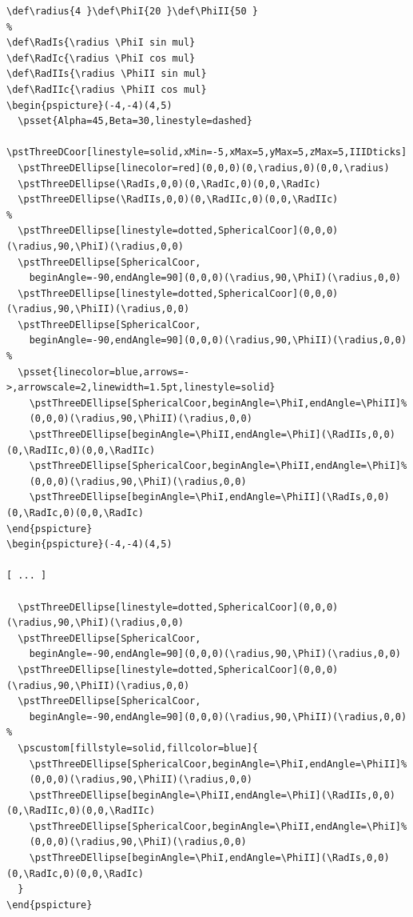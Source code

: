 \documentclass[11pt,english,bibliography=totoc,parskip=false,headings=small,
    headinclude=false,footinclude=false,twoside,english,usegeometry]{pst-doc}
\begin{document}
\begin{lstlisting}
\def\radius{4 }\def\PhiI{20 }\def\PhiII{50 }
%
\def\RadIs{\radius \PhiI sin mul}
\def\RadIc{\radius \PhiI cos mul}
\def\RadIIs{\radius \PhiII sin mul}
\def\RadIIc{\radius \PhiII cos mul}
\begin{pspicture}(-4,-4)(4,5)
  \psset{Alpha=45,Beta=30,linestyle=dashed}
  \pstThreeDCoor[linestyle=solid,xMin=-5,xMax=5,yMax=5,zMax=5,IIIDticks]
  \pstThreeDEllipse[linecolor=red](0,0,0)(0,\radius,0)(0,0,\radius)
  \pstThreeDEllipse(\RadIs,0,0)(0,\RadIc,0)(0,0,\RadIc)
  \pstThreeDEllipse(\RadIIs,0,0)(0,\RadIIc,0)(0,0,\RadIIc)
%
  \pstThreeDEllipse[linestyle=dotted,SphericalCoor](0,0,0)(\radius,90,\PhiI)(\radius,0,0)
  \pstThreeDEllipse[SphericalCoor,
	beginAngle=-90,endAngle=90](0,0,0)(\radius,90,\PhiI)(\radius,0,0)
  \pstThreeDEllipse[linestyle=dotted,SphericalCoor](0,0,0)(\radius,90,\PhiII)(\radius,0,0)
  \pstThreeDEllipse[SphericalCoor,
	beginAngle=-90,endAngle=90](0,0,0)(\radius,90,\PhiII)(\radius,0,0)
%
  \psset{linecolor=blue,arrows=->,arrowscale=2,linewidth=1.5pt,linestyle=solid}
    \pstThreeDEllipse[SphericalCoor,beginAngle=\PhiI,endAngle=\PhiII]%
	(0,0,0)(\radius,90,\PhiII)(\radius,0,0)
    \pstThreeDEllipse[beginAngle=\PhiII,endAngle=\PhiI](\RadIIs,0,0)(0,\RadIIc,0)(0,0,\RadIIc)
    \pstThreeDEllipse[SphericalCoor,beginAngle=\PhiII,endAngle=\PhiI]%
	(0,0,0)(\radius,90,\PhiI)(\radius,0,0)
    \pstThreeDEllipse[beginAngle=\PhiI,endAngle=\PhiII](\RadIs,0,0)(0,\RadIc,0)(0,0,\RadIc)
\end{pspicture}
\begin{pspicture}(-4,-4)(4,5)

[ ... ]

  \pstThreeDEllipse[linestyle=dotted,SphericalCoor](0,0,0)(\radius,90,\PhiI)(\radius,0,0)
  \pstThreeDEllipse[SphericalCoor,
	beginAngle=-90,endAngle=90](0,0,0)(\radius,90,\PhiI)(\radius,0,0)
  \pstThreeDEllipse[linestyle=dotted,SphericalCoor](0,0,0)(\radius,90,\PhiII)(\radius,0,0)
  \pstThreeDEllipse[SphericalCoor,
	beginAngle=-90,endAngle=90](0,0,0)(\radius,90,\PhiII)(\radius,0,0)
%
  \pscustom[fillstyle=solid,fillcolor=blue]{
    \pstThreeDEllipse[SphericalCoor,beginAngle=\PhiI,endAngle=\PhiII]%
	(0,0,0)(\radius,90,\PhiII)(\radius,0,0)
    \pstThreeDEllipse[beginAngle=\PhiII,endAngle=\PhiI](\RadIIs,0,0)(0,\RadIIc,0)(0,0,\RadIIc)
    \pstThreeDEllipse[SphericalCoor,beginAngle=\PhiII,endAngle=\PhiI]%
	(0,0,0)(\radius,90,\PhiI)(\radius,0,0)
    \pstThreeDEllipse[beginAngle=\PhiI,endAngle=\PhiII](\RadIs,0,0)(0,\RadIc,0)(0,0,\RadIc)
  }
\end{pspicture}
\end{lstlisting}
\end{document}
